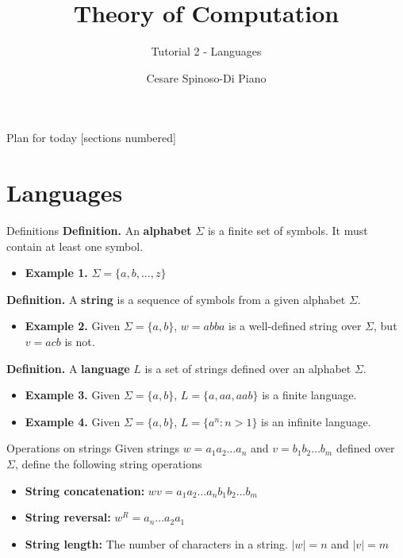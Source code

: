 \documentclass[10pt]{beamer}
\title{Theory of Computation}
\subtitle{Tutorial 2 - Languages}
\author{Cesare Spinoso-Di Piano}
\date{}
\begin{document}
\maketitle

\begin{frame}{Plan for today}
    [sections numbered]
    \tableofcontents[hideallsubsections]
\end{frame}

\section{Languages}

\begin{frame}{Definitions}
    \textbf{Definition.} An \textbf{alphabet} $\Sigma$ is a finite set of symbols. It must contain at least one symbol.
    \begin{itemize}
        \item \textbf{Example 1.} $\Sigma = \{a,b,...,z\}$
    \end{itemize}
    \textbf{Definition.} A \textbf{string} is a sequence of symbols from a given alphabet $\Sigma$.
    \begin{itemize}
        \item \textbf{Example 2.} Given $\Sigma = \{a,b\}$, $w = abba$ is a well-defined string over $\Sigma$, but $v = acb$ is not. %
    \end{itemize}
    \textbf{Definition.} A \textbf{language} $L$ is a set of strings defined over an alphabet $\Sigma$.
    \begin{itemize}[itemsep=5mm, parsep=0pt]
        \item \textbf{Example 3.} Given $\Sigma=\{a,b\}$, $L=\{a,aa,aab\}$ is a finite language.
        \item \textbf{Example 4.} Given $\Sigma=\{a,b\}$, $L=\{a^n : n > 1\}$ is an infinite language.
    \end{itemize}
\end{frame}
\begin{frame}{Operations on strings}
    Given strings $w = a_1a_2\dots a_n$ and $v = b_1b_2 \dots b_m$ defined over $\Sigma$, define the following string operations
    \begin{itemize}[itemsep=5mm, parsep=0pt]
        \item \textbf{String concatenation: } $ wv = a_1a_2\dots a_n b_1b_2 \dots b_m$
        \item \textbf{String reversal: } $w^R = a_n \dots a_2a_1$
        \item \textbf{String length: }The number of characters in a string. $|w| = n$ and $|v| = m$

    \end{itemize}
\end{frame}
\end{document}
